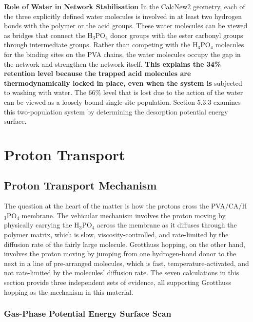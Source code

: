 \documentclass[12pt,a4paper]{report}
\begin{document}
\textbf{Role of Water in Network Stabilisation}
In the CalcNew2 geometry, each of the three explicitly defined water molecules is involved in at least two hydrogen bonds with the polymer or the acid groups. These water molecules can be viewed as bridges that connect the H\(_3\)PO\(_4\) donor groups with the ester carbonyl groups through intermediate groups. Rather than competing with the H\(_3\)PO\(_4\) molecules for the binding sites on the PVA chains, the water molecules occupy the gap in the network and strengthen the network itself.\cite{61,62,63} \textbf{This explains the 34\% retention level because the trapped acid molecules are thermodynamically locked in place, even when the system is }subjected to washing with water. The 66\% level that is lost due to the action of the water can be viewed as a loosely bound single-site population. Section 5.3.3 examines this two-population system by determining the desorption potential energy surface.

\section{Proton Transport}
\subsection{Proton Transport Mechanism}
The question at the heart of the matter is how the protons cross the PVA/CA/H\(_3\)PO\(_4\) membrane. The vehicular mechanism involves the proton moving by physically carrying the H\(_3\)PO\(_4\) across the membrane as it diffuses through the polymer matrix, which is slow, viscosity-controlled, and rate-limited by the diffusion rate of the fairly large molecule. Grotthuss hopping, on the other hand, involves the proton moving by jumping from one hydrogen-bond donor to the next in a line of pre-arranged molecules, which is fast, temperature-activated, and not rate-limited by the molecules’ diffusion rate.\cite{16, 17, 21} The seven calculations in this section provide three independent sets of evidence, all supporting Grotthuss hopping as the mechanism in this material.

\subsubsection{Gas-Phase Potential Energy Surface Scan}
\end{document}
